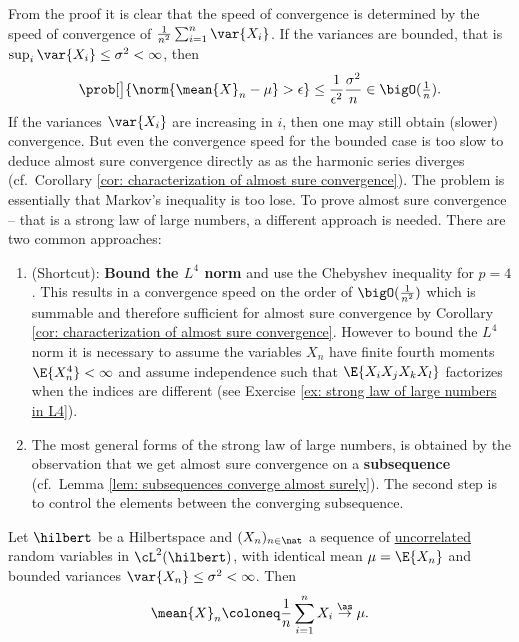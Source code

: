 From the proof it is clear that the speed of convergence is determined by the
speed of convergence of \(\frac1{n^2} \sum_{i=1}^n \var{X_i}\).
If the variances are bounded, that is
\(\sup_{i}\var{X_i} \le \sigma^2 < \infty\),
then
\begin{equation}
    \label{eq: rate of convergence for bounded variance}    
    \prob[\big]{\norm{\mean{X}_n - \mu} > \epsilon}
    \le \frac1{\epsilon^2}\frac{\sigma^2}{n} \in \bigO(\tfrac1n).
\end{equation}
If the variances \(\var{X_i}\) are increasing in \(i\), then one
may still obtain (slower) convergence. But even the convergence speed for the
bounded case is too slow to deduce almost sure convergence directly as 
as the harmonic series diverges (cf.\ Corollary \ref{cor: characterization of
almost sure convergence}). The problem is essentially that Markov's inequality
is too lose. To prove almost sure convergence -- that is a strong
law of large numbers, a different approach is needed. There are
two common approaches:
\begin{enumerate}
    \item (Shortcut): \textbf{Bound the \(L^4\) norm} and use the Chebyshev inequality
    for \(p=4\). This results in a convergence speed on the order of
    \(\bigO(\frac1{n^2})\) which is summable and therefore sufficient for almost
    sure convergence by Corollary \ref{cor: characterization of almost sure
    convergence}.  However to bound the \(L^4\) norm it is necessary to assume
    the variables \(X_n\) have finite fourth moments \(\E{X_n^4} < \infty\) and
    assume independence such that \(\E{X_i X_j X_k X_l}\) factorizes when the
    indices are different (see Exercise \ref{ex: strong law of large numbers in
    L4}).

    \item The most general forms of the strong law of large numbers, is
    obtained by the observation that we get almost sure convergence
    on a \textbf{subsequence} (cf.\ Lemma \ref{lem: subsequences converge almost
    surely}). The second step is to control the elements between the
    converging subsequence.
\end{enumerate}

\begin{mdframed}[innertopmargin=0pt]%
\begin{theorem}
    \label{thm: strong law of large numbers}
    Let \(\hilbert\) be a Hilbertspace and \((X_n)_{n\in \nat}\) a sequence
    of \underline{uncorrelated} random variables in \(\cL^2(\hilbert)\), with identical mean
    \(\mu = \E{X_n}\) and bounded variances \(\var{X_n} \le \sigma^2 < \infty\).
    Then
    \[
        \mean{X}_n \coloneq \frac1n \sum_{i=1}^n X_i \overset{\as}\to \mu.
    \]
\end{theorem}
\end{mdframed}

